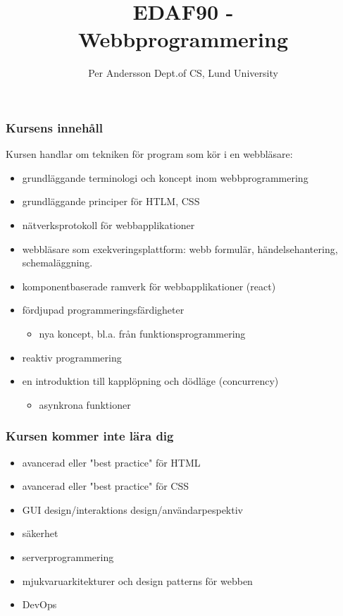 \documentclass[aspectratio=1610]{beamer}
\title[EDAF90 Webbprogrammering]{EDAF90 - \\Webbprogrammering}
\author[Per Andersson]{%
  Per Andersson\newline
  Dept.\@ of CS, Lund University}
\begin{document}
\begin{frame}[plain]%
  \titlepage
\end{frame}

\begin{frame}
  \frametitle{Kursens innehåll}

Kursen handlar om tekniken för program som kör i en webbläsare:
\begin{itemize}
\item grundläggande terminologi och koncept inom webbprogrammering
\item grundläggande principer för HTLM, CSS
\item nätverksprotokoll för webbapplikationer
\item webbläsare som exekveringsplattform: webb formulär, händelsehantering, schemaläggning.
\item komponentbaserade ramverk för webbapplikationer (react)
\item fördjupad programmeringsfärdigheter
\begin{itemize}
  \item nya koncept, bl.a. från funktionsprogrammering
\end{itemize}
\item reaktiv programmering
\item en introduktion till kapplöpning och dödläge (concurrency)
\begin{itemize}
  \item asynkrona funktioner
\end{itemize}
\end{itemize}

\end{frame}


\begin{frame}
  \frametitle{Kursen kommer inte lära dig}
\begin{itemize}
\item avancerad eller "best practice" för HTML
\item avancerad eller "best practice" för CSS
\item GUI design/interaktions design/användarpespektiv
\item säkerhet
\item serverprogrammering
\item mjukvaruarkitekturer och design patterns för webben
\item DevOps
\end{itemize}

\end{frame}
\end{document}
